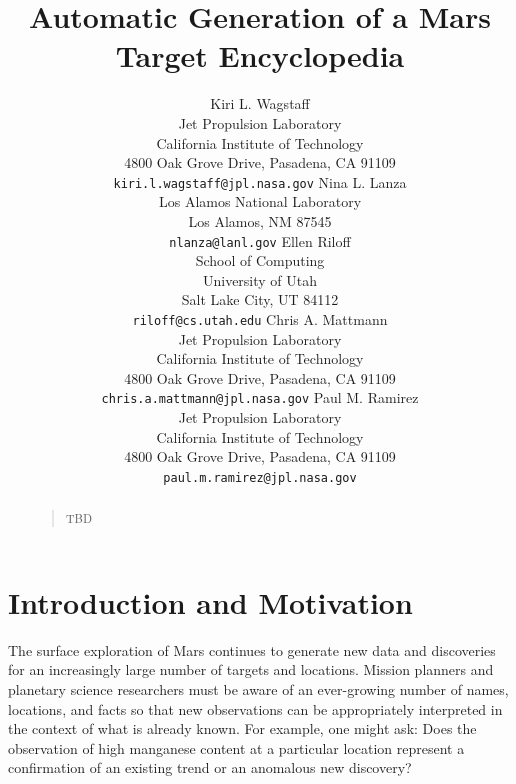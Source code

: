 \documentclass[letterpaper]{article}
\begin{document}
%
\title{Automatic Generation of a Mars Target Encyclopedia}
\author{Kiri L. Wagstaff \\
Jet Propulsion Laboratory\\
California Institute of Technology\\
4800 Oak Grove Drive, Pasadena, CA 91109\\
{\tt kiri.l.wagstaff@jpl.nasa.gov}
\And
Nina L. Lanza\\
Los Alamos National Laboratory \\
Los Alamos, NM  87545\\
{\tt nlanza@lanl.gov}
\And
Ellen Riloff\\
School of Computing\\
University of Utah\\
Salt Lake City, UT 84112\\
{\tt riloff@cs.utah.edu}
\AND
Chris A. Mattmann\\ 
\normalsize Jet Propulsion Laboratory\\
\normalsize California Institute of Technology\\
\normalsize 4800 Oak Grove Drive, Pasadena, CA 91109\\
\normalsize {\tt chris.a.mattmann@jpl.nasa.gov}
\And
Paul M. Ramirez\\
\normalsize Jet Propulsion Laboratory\\
\normalsize California Institute of Technology\\
\normalsize 4800 Oak Grove Drive, Pasadena, CA 91109\\
\normalsize {\tt paul.m.ramirez@jpl.nasa.gov}
}
\maketitle
\begin{abstract}
\begin{quote}
TBD
\end{quote}
\end{abstract}

\section{Introduction and Motivation}

The surface exploration of Mars continues to generate new data and
discoveries for an increasingly large number of targets and locations.
Mission planners and planetary science researchers must be aware of an
ever-growing number of names, locations, and facts so that new
observations can be appropriately interpreted in the context of what
is already known.  For example, one might ask: Does the observation of
high manganese content at a particular location represent a
confirmation of an existing trend or an anomalous new discovery?
\end{document}
